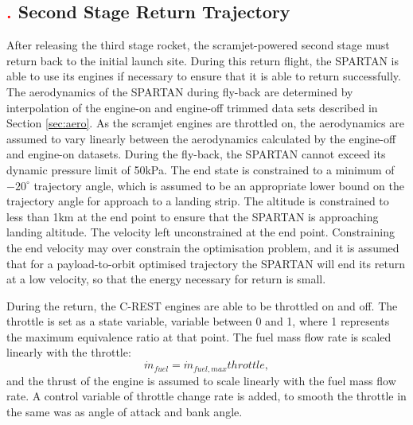 \subsection{\textcolor{red}{.} Second Stage Return Trajectory}
After releasing the third stage rocket, the scramjet-powered second stage must return back to the initial launch site. During this return flight, the SPARTAN is able to use its engines if necessary to ensure that it is able to return successfully. The aerodynamics of the SPARTAN during fly-back are determined by interpolation of the engine-on and engine-off trimmed data sets described in Section \ref{sec:aero}. As the scramjet engines are throttled on, the aerodynamics are assumed to vary linearly between the aerodynamics calculated by the engine-off and engine-on datasets. 
During the fly-back, the SPARTAN cannot exceed its dynamic pressure limit of 50kPa. 
 The end state is constrained to a minimum of $-20^\circ$ trajectory angle, which is assumed to be an appropriate lower bound on the trajectory angle for approach to a landing strip. The altitude is constrained to less than 1km at the end point to ensure that the SPARTAN is approaching landing altitude.
 The velocity left unconstrained at the end point. Constraining the end velocity may over constrain the optimisation problem, and it is assumed that for a payload-to-orbit optimised trajectory the SPARTAN will end its return at a low velocity, so that the energy necessary for return is small. 
 
During the return, the C-REST engines are able to be throttled on and off. The throttle is set as a state variable, variable between 0 and 1, where 1 represents the maximum equivalence ratio at that point. The fuel mass flow rate is scaled linearly with the throttle:  
\begin{equation}
\dot{m}_{fuel} = \dot{m}_{fuel,max}throttle,
\end{equation}
and the thrust of the engine is assumed to scale linearly with the fuel mass flow rate. A control variable of throttle change rate is added, to smooth the throttle in the same was as angle of attack and bank angle. 


